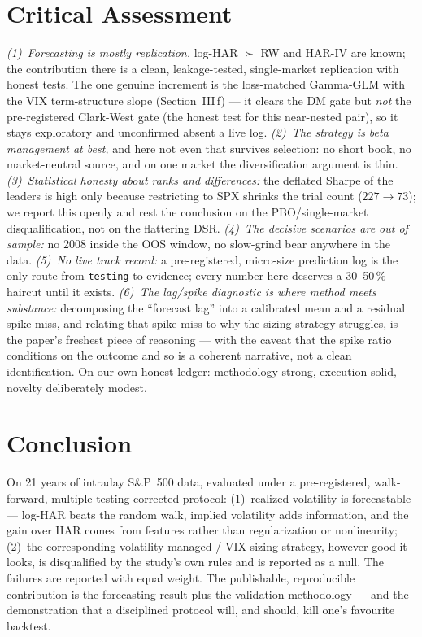\documentclass[12pt,a4paper]{article}
\begin{document}
\section{Critical Assessment}

\emph{(1)~Forecasting is mostly replication.} log-HAR $\succ$ RW and HAR-IV are known; the
contribution there is a clean, leakage-tested, single-market replication with honest tests. The one
genuine increment is the loss-matched Gamma-GLM with the VIX term-structure slope (Section~III\,f) ---
it clears the DM gate but \emph{not} the pre-registered Clark-West gate (the honest test for this near-nested pair), so it stays exploratory and unconfirmed absent a live log. \emph{(2)~The strategy is beta management at
best,} and here not even that survives selection: no short book, no market-neutral source, and on one
market the diversification argument is thin. \emph{(3)~Statistical honesty about ranks and
differences:} the deflated Sharpe of the leaders is high only because restricting to SPX shrinks the
trial count ($227\to73$); we report this openly and rest the conclusion on the PBO/single-market
disqualification, not on the flattering DSR. \emph{(4)~The decisive scenarios are out of sample:} no
2008 inside the OOS window, no slow-grind bear anywhere in the data. \emph{(5)~No live track record:}
a pre-registered, micro-size prediction log is the only route from \texttt{testing} to evidence; every
number here deserves a 30--50\,\% haircut until it exists. \emph{(6)~The lag/spike diagnostic is where
method meets substance:} decomposing the ``forecast lag'' into a calibrated mean and a residual
spike-miss, and relating that spike-miss to why the sizing strategy struggles, is the paper's freshest
piece of reasoning --- with the caveat that the spike ratio conditions on the outcome and so is a
coherent narrative, not a clean identification. On our own honest ledger: methodology strong,
execution solid, novelty deliberately modest.

\section{Conclusion}

On 21 years of intraday S\&P~500 data, evaluated under a pre-registered, walk-forward,
multiple-testing-corrected protocol: (1)~realized volatility is forecastable --- log-HAR beats the
random walk, implied volatility adds information, and the gain over HAR comes from features rather than
regularization or nonlinearity; (2)~the corresponding volatility-managed / VIX sizing strategy, however
good it looks, is disqualified by the study's own rules and is reported as a null. The failures are
reported with equal weight. The publishable, reproducible contribution is the forecasting result plus
the validation methodology --- and the demonstration that a disciplined protocol will, and should, kill
one's favourite backtest.
\end{document}
